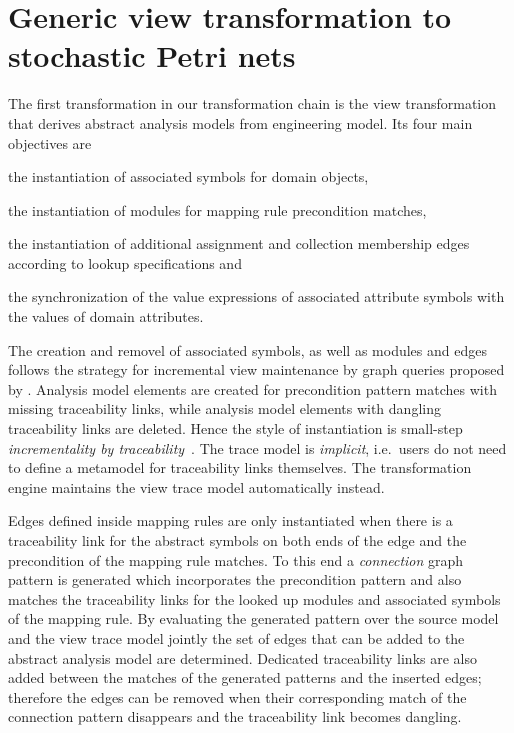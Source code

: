 \section{Generic view transformation to stochastic Petri nets}
\label{chap:transform:view}

The first transformation in our transformation chain is the view transformation that derives abstract  analysis models from engineering model. Its four main objectives are
\begin{itemize*}
\item the instantiation of associated symbols for domain objects,
\item the instantiation of  modules for mapping rule precondition matches,
\item the instantiation of additional assignment and collection membership edges according to lookup specifications and
\item the synchronization of the value expressions of associated attribute symbols with the values of domain attributes.
\end{itemize*}

The creation and removel of associated symbols, as well as  modules and edges follows the strategy for incremental view maintenance by graph queries proposed by \citet{Debreceni14viewmodel}. Analysis model elements are created for precondition pattern matches with missing traceability links, while analysis model elements with dangling traceability links are deleted. Hence the style of instantiation is small-step \emph{incrementality by traceability}~\citep{Varro15styles}. The trace model is \emph{implicit}, i.e.~users do not need to define a metamodel for traceability links themselves. The transformation engine maintains the view trace model automatically instead.

Edges defined inside mapping rules are only instantiated when there is a traceability link for the abstract  symbols on both ends of the edge and the precondition of the mapping rule matches. To this end a \emph{connection} graph pattern is generated which incorporates the precondition pattern and  also matches the traceability links for the looked up  modules and associated symbols of the mapping rule. By evaluating the generated pattern over the source model and the view trace model jointly the set of edges that can be added to the abstract analysis model are determined. Dedicated traceability links are also added between the matches of the generated patterns and the inserted edges; therefore the edges can be removed when their corresponding match of the connection pattern disappears and the traceability link becomes dangling.

